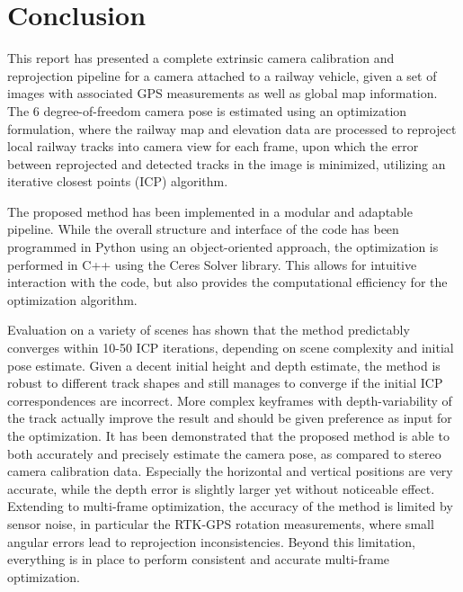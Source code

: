 \chapter{Conclusion}
\label{chapter:conclusion}

This report has presented a complete extrinsic camera calibration and reprojection pipeline for a camera attached to a railway vehicle, given a set of images with associated GPS measurements as well as global map information. The 6 degree-of-freedom camera pose is estimated using an optimization formulation, where the railway map and elevation data are processed to reproject local railway tracks into camera view for each frame, upon which the error between reprojected and detected tracks in the image is minimized, utilizing an iterative closest points (ICP) algorithm.

The proposed method has been implemented in a modular and adaptable pipeline. While the overall structure and interface of the code has been programmed in Python using an object-oriented approach, the optimization is performed in C++ using the Ceres Solver library. This allows for intuitive interaction with the code, but also provides the computational efficiency for the optimization algorithm.

Evaluation on a variety of scenes has shown that the method predictably converges within 10-50 ICP iterations, depending on scene complexity and initial pose estimate. Given a decent initial height and depth estimate, the method is robust to different track shapes and still manages to converge if the initial ICP correspondences are incorrect. More complex keyframes with depth-variability of the track actually improve the result and should be given preference as input for the optimization.
It has been demonstrated that the proposed method is able to both accurately and precisely estimate the camera pose, as compared to stereo camera calibration data. Especially the horizontal and vertical positions are very accurate, while the depth error is slightly larger yet without noticeable effect. Extending to multi-frame optimization, the accuracy of the method is limited by sensor noise, in particular the RTK-GPS rotation measurements, where small angular errors lead to reprojection inconsistencies. Beyond this limitation, everything is in place to perform consistent and accurate multi-frame optimization.

